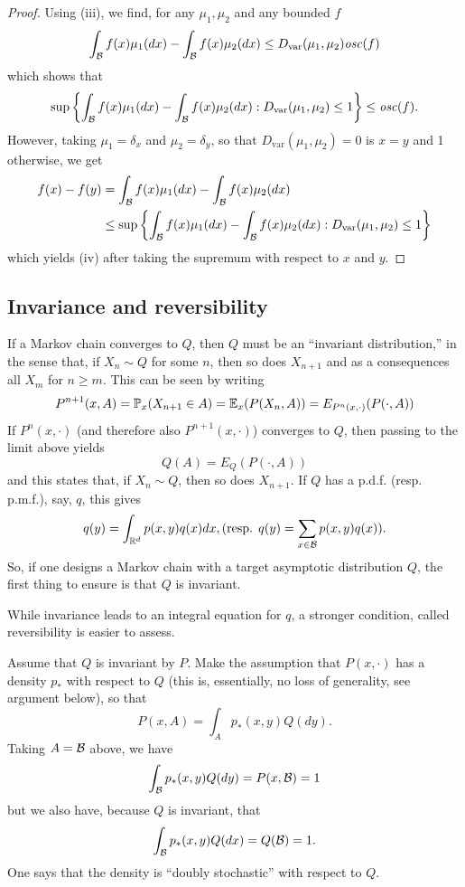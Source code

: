\begin{proof}
Using (iii), we find, for any $\mu_1, \mu_2$ and any bounded $f$
\[
\int_{{\mathcal B}} f(x) \mu_1(dx) - \int_{{\mathcal B}} f(x) \mu_2(dx) \leq D_{\mathrm{var}}(\mu_1,\mu_2) \mathit{osc}(f)
\]
which shows that
\[
\sup\left\{ \int_{{\mathcal B}} f(x) \mu_1(dx) - \int_{{\mathcal B}} f(x) \mu_2(dx) : D_{\mathrm{var}}(\mu_1,\mu_2) \leq 1\right\} \leq \mathit{osc}(f).
\]
However, taking $\mu_1 = \delta_x$ and $\mu_2 = \delta_y$, so that  $D_{\mathrm{var}}(\mu_1,\mu_2) = 0$ is $x=y$ and 1 otherwise, we get
\begin{align*}
f(x) - f(y) &= \int_{{\mathcal B}} f(x) \mu_1(dx) - \int_{{\mathcal B}} f(x) \mu_2(dx)\\
&\leq  \sup\left\{ \int_{{\mathcal B}} f(x) \mu_1(dx) - \int_{{\mathcal B}} f(x) \mu_2(dx) : D_{\mathrm{var}}(\mu_1,\mu_2) \leq 1\right\} 
\end{align*}
which yields (iv) after taking the supremum with respect to $x$ and $y$.
\end{proof}




\subsection{Invariance and reversibility}
\label{sec:mcmc.reversible}
If a Markov chain converges to $Q$, then $Q$ must be an ``invariant distribution,'' in the sense that, if $X_n \sim Q$ for some $n$, then so does $X_{n+1}$ and as a consequences all $X_m$ for $n\geq m$. This can be seen by writing
\[
P^{n+1}(x,A) = \bm{\mathbb P}_x(X_{n+1} \in A) = \bm{\mathbb E}_x(P(X_n, A)) = E_{P^n(x, \cdot)}(P(\cdot, A))
\]
If $P^n(x, \cdot)$ (and therefore also $P^{n+1}(x, \cdot)$) converges to $Q$, then passing to the limit above yields
\[
Q(A)= E_{Q}(P(\cdot, A))
\]
and this states that, if $X_n\sim Q$, then so does $X_{n+1}$. If $Q$ has a p.d.f. (resp. p.m.f.), say, $q$, this gives
\[
q(y) = \int_{{\mathbb{R}}^d} p(x, y)q(x)dx, (\text{resp. } q(y) = \sum_{x\in{\mathcal B}} p(x, y)q(x)).
\]
So, if one designs a Markov chain with a target asymptotic distribution $Q$, the first thing to ensure is that $Q$ is invariant. 






While invariance leads to an integral equation for $q$, a stronger condition, called reversibility is easier to assess. 

Assume that $Q$ is invariant by $P$. Make the assumption that $P(x, \cdot)$ has a density $p_*$ with respect to $Q$ (this is, essentially, no loss of generality, see argument below), so that
\[
P(x, A) = \int_{A} p_*(x, y) Q(dy).
\]
 Taking $A= {\mathcal B}$ above, we have
\[
\int_{{\mathcal B}} p_*(x, y) Q(dy) = P(x, {\mathcal B}) = 1
\]
but we also have, because $Q$ is invariant, that 
\[
\int_{{\mathcal B}} p_*(x, y) Q(dx) = Q({\mathcal B}) = 1.
\]
One says that the  density is ``doubly stochastic'' with respect to $Q$.

